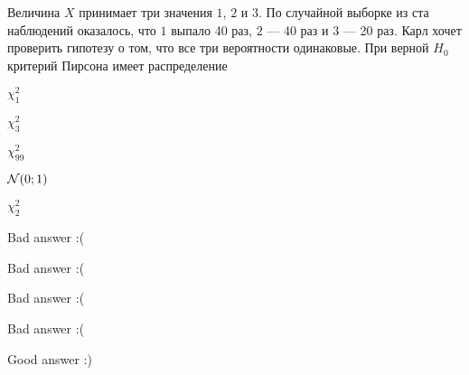 
\begin{question}
Величина \(X\) принимает три значения \(1\), \(2\) и \(3\). По случайной
выборке из ста наблюдений оказалось, что \(1\) выпало 40 раз, \(2\) ---
40 раз и \(3\) --- 20 раз. Карл хочет проверить гипотезу о том, что все
три вероятности одинаковые. При верной \(H_0\) критерий Пирсона имеет
распределение
\begin{answerlist}
  \item \(\chi^2_1\)
  \item \(\chi^2_3\)
  \item \(\chi^2_{99}\)
  \item \(\mathcal{N}(0;1)\)
  \item \(\chi^2_2\)
\end{answerlist}
\end{question}

\begin{solution}
\begin{answerlist}
  \item Bad answer :(
  \item Bad answer :(
  \item Bad answer :(
  \item Bad answer :(
  \item Good answer :)
\end{answerlist}
\end{solution}

